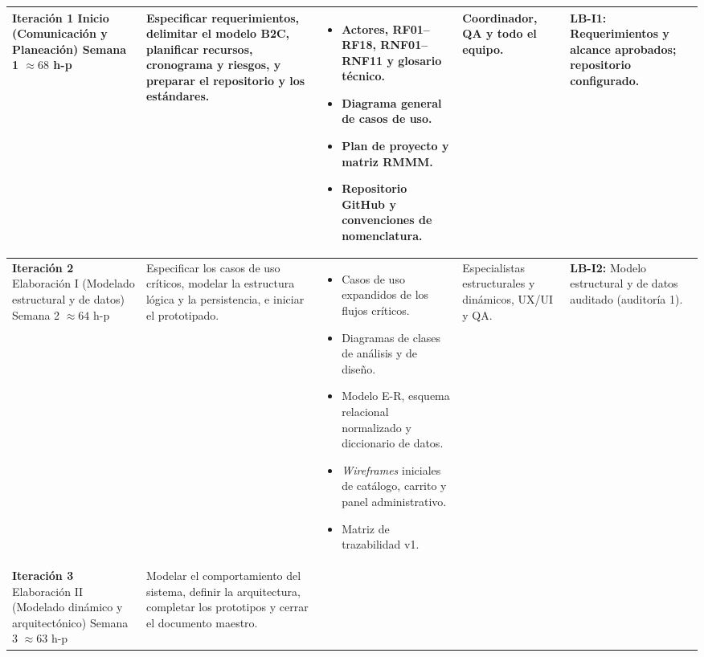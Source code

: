 {\begin{xltabular}{\textwidth}{|>{\raggedright\arraybackslash}p{2.4cm}|>{\raggedright\arraybackslash}p{3.2cm}|X|>{\raggedright\arraybackslash}p{2.2cm}|>{\raggedright\arraybackslash}p{2.4cm}|}
    \textbf{Iteración 1} \newline Inicio (Comunicación y Planeación) \newline Semana 1 \newline $\approx 68$ h-p & Especificar requerimientos, delimitar el modelo B2C, planificar recursos, cronograma y riesgos, y preparar el repositorio y los estándares. & 
    \begin{itemize}[leftmargin=*, nosep]
        \item Actores, RF01--RF18, RNF01--RNF11 y glosario técnico.
        \item Diagrama general de casos de uso.
        \item Plan de proyecto y matriz RMMM.
        \item Repositorio GitHub y convenciones de nomenclatura.
    \end{itemize} & Coordinador, QA y todo el equipo. & \textbf{LB-I1:} Requerimientos y alcance aprobados; repositorio configurado. \\*
    \hline
    \textbf{Iteración 2} \newline Elaboración I (Modelado estructural y de datos) \newline Semana 2 \newline $\approx 64$ h-p & Especificar los casos de uso críticos, modelar la estructura lógica y la persistencia, e iniciar el prototipado. & 
    \begin{itemize}[leftmargin=*, nosep]
        \item Casos de uso expandidos de los flujos críticos.
        \item Diagramas de clases de análisis y de diseño.
        \item Modelo E-R, esquema relacional normalizado y diccionario de datos.
        \item \textit{Wireframes} iniciales de catálogo, carrito y panel administrativo.
        \item Matriz de trazabilidad v1.
    \end{itemize} & Especialistas estructurales y dinámicos, UX/UI y QA. & \textbf{LB-I2:} Modelo estructural y de datos auditado (auditoría 1). \\*
    \hline
    \textbf{Iteración 3} \newline Elaboración II (Modelado dinámico y arquitectónico) \newline Semana 3 \newline $\approx 63$ h-p & Modelar el comportamiento del sistema, definir la arquitectura, completar los prototipos y cerrar el documento maestro. & 

\end{xltabular}}
